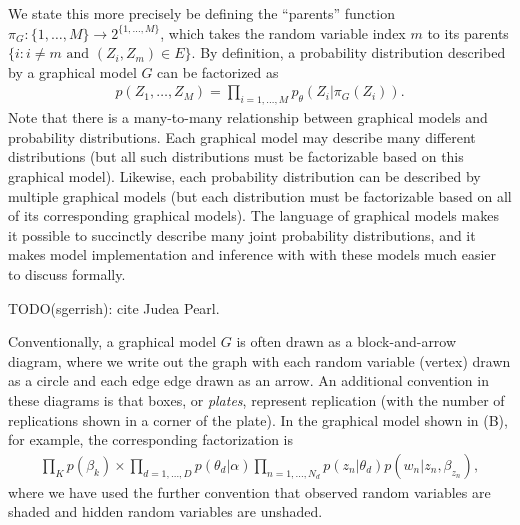 We state this more precisely be defining the ``parents'' function
$\pi_G : \{ 1, \ldots, M \} \rightarrow 2^{\{ 1, \ldots, M \}}$, which
takes the random variable index $m$ to its parents $\{ i : i \neq m
\mbox{ and } (Z_i, Z_m) \in E \}$.  By definition, a probability
distribution described by a graphical model $G$ can be factorized as
\begin{align}
  p(Z_1, \ldots, Z_M) = \prod_{i=1, \ldots, M} p_\theta(Z_i | \pi_G(Z_i) ).
\end{align}
Note that there is a many-to-many relationship between graphical
models and probability distributions. Each graphical model may
describe many different distributions (but all such distributions must
be factorizable based on this graphical model).  Likewise, each
probability distribution can be described by multiple graphical
models (but each distribution must be factorizable based on all of its
corresponding graphical models). The language of graphical
models makes it possible to succinctly describe many joint probability
distributions, and it makes model implementation and inference with
with these models much easier to discuss formally.

TODO(sgerrish): cite Judea Pearl.

Conventionally, a graphical model $G$ is often drawn as a
block-and-arrow diagram, where we write out the graph with each random
variable (vertex) drawn as a circle and each edge edge drawn as an
arrow.  An additional convention in these diagrams is that boxes, or
\emph{plates}, represent replication (with the number of replications
shown in a corner of the plate). In the graphical model shown in
 (B), for example, the corresponding
factorization is
\begin{align}
  \prod_K p(\beta_k) \times \prod_{d=1,\ldots,D} p(\theta_d | \alpha) \prod_{n=1,\ldots,N_d} p(z_n | \theta_d) p(w_n | z_n, \beta_{z_n}),
\end{align}
where we have used the further convention that observed random
variables are shaded and hidden random variables are unshaded.

